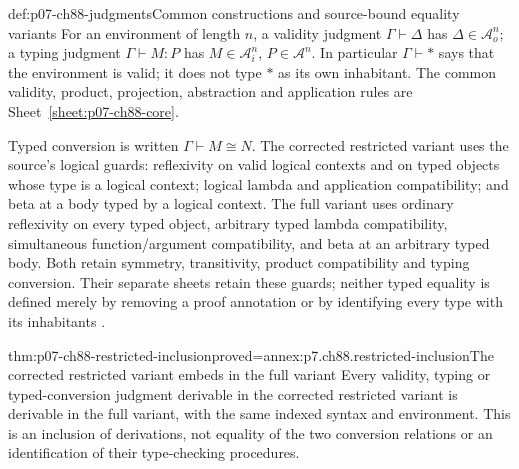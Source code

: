 \begin{hbdefinition}{def:p07-ch88-judgments}{Common constructions and source-bound equality variants}
For an environment of length \(n\), a validity judgment
\(\Gamma\vdash\Delta\) has \(\Delta\in\mathcal A_o^n\);
a typing judgment \(\Gamma\vdash M:P\) has
\(M\in\mathcal A_i^n\), \(P\in\mathcal A^n\).
In particular \(\Gamma\vdash\ast\) says that the environment
is valid; it does not type \(\ast\) as its own inhabitant.
The common validity, product, projection, abstraction and application
rules are Sheet~\ref{sheet:p07-ch88-core}.

Typed conversion is written \(\Gamma\vdash M\cong N\).
The corrected restricted variant uses the source's logical guards:
reflexivity on valid logical contexts and on typed objects whose type
is a logical context; logical lambda and application compatibility;
and beta at a body typed by a logical context. The full variant uses
ordinary reflexivity on every typed object, arbitrary typed lambda
compatibility, simultaneous function/argument compatibility, and beta
at an arbitrary typed body. Both retain symmetry, transitivity, product
compatibility and typing conversion. Their separate sheets retain these
guards; neither typed equality is defined merely by removing a proof
annotation or by identifying every type with its inhabitants
\cite[\S3.1, pp.~101--102]{CoquandHuet1988}.
\end{hbdefinition}

\begin{hblemma}{thm:p07-ch88-restricted-inclusion}{proved=annex:p7.ch88.restricted-inclusion}{The corrected restricted variant embeds in the full variant}
Every validity, typing or typed-conversion judgment derivable in the
corrected restricted variant is derivable in the full variant, with
the same indexed syntax and environment. This is an inclusion of
derivations, not equality of the two conversion relations or an
identification of their type-checking procedures.
\end{hblemma}

